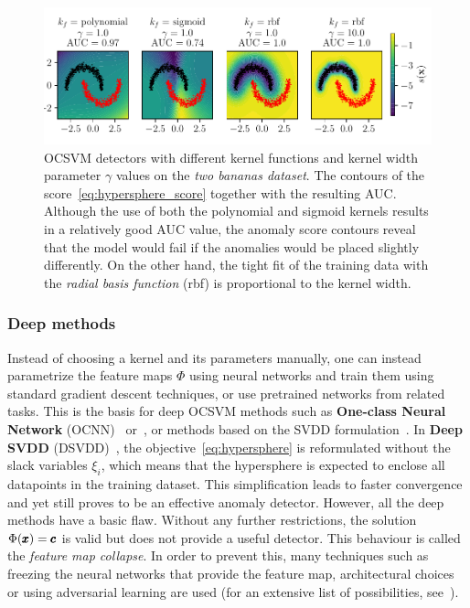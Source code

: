 \begin{figure}
\begin{centering}
\includegraphics[scale=0.98]{data/chapter_intro/ocsvm_examples.pdf}
\end{centering}
\caption{OCSVM detectors with different kernel functions and kernel width parameter $\gamma$ values on the \textit{two bananas dataset}. The contours of the score~\eqref{eq:hypersphere_score} together with the resulting AUC. Although the use of both the polynomial and sigmoid kernels results in a relatively good AUC value, the anomaly score contours reveal that the model would fail if the anomalies would be placed slightly differently. On the other hand, the tight fit of the training data with the \textit{radial basis function} (rbf) is proportional to the kernel width.}
\label{fig:ocsvm_examples}
\end{figure}

\subsubsection{Deep methods} \label{ref:sec_deep_domain}
Instead of choosing a kernel and its parameters manually, one can instead parametrize the feature maps $\Phi$ using neural networks and train them using standard gradient descent techniques, or use pretrained networks from related tasks. This is the basis for deep OCSVM methods such as \textbf{One-class Neural Network} (OCNN)~\cite{chalapathy2018anomaly} or~\cite{erfani2016high}, or methods based on the SVDD formulation~\cite{ghafoori2020deep}. In \textbf{Deep SVDD} (DSVDD)~\cite{ruff2018deep}, the objective~\eqref{eq:hypersphere} is reformulated without the slack variables $\xi_i$, which means that the hypersphere is expected to enclose all datapoints in the training dataset. This simplification leads to faster convergence and yet still proves to be an effective anomaly detector. However, all the deep methods have a basic flaw. Without any further restrictions, the solution $\Phi(\pmb{{x}}) = \pmb{{c}}$ is valid but does not provide a useful detector. This behaviour is called the \textit{feature map collapse}. In order to prevent this, many techniques such as freezing the neural networks that provide the feature map, architectural choices or using adversarial learning are used (for an extensive list of possibilities, see~\cite{ruff2020unifying}).

